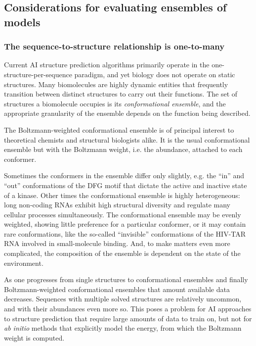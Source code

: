 \documentclass[%
 aip,
 amsmath,amssymb,
 reprint,%
]{revtex4-1}
\begin{document}
\subsection{Considerations for evaluating ensembles of models}

\subsubsection{The sequence-to-structure relationship is one-to-many}

Current AI structure prediction algorithms primarily operate in the one-structure-per-sequence paradigm, and yet biology does not operate on static structures. Many biomolecules are highly dynamic entities that frequently transition between distinct structures to carry out their functions. The set of structures a biomolecule occupies is its {\it conformational ensemble}, and the appropriate granularity of the ensemble depends on the function being described. 

The Boltzmann-weighted conformational ensemble is of principal interest to theoretical chemists and structural biologists alike. It is the usual conformational ensemble but with the Boltzmann weight, i.e. the abundance, attached to each conformer.

Sometimes the conformers in the ensemble differ only slightly, e.g. the ``in'' and ``out'' conformations of the DFG motif that dictate the active and inactive state of a kinase. Other times the conformational ensemble is highly heterogeneous: long non-coding RNAs exhibit high structural diversity and regulate many cellular processes simultaneously. The conformational ensemble may be evenly weighted, showing little preference for a particular conformer, or it may contain rare conformations, like the so-called ``invisible'' conformations of the HIV-TAR RNA involved in small-molecule binding. And, to make matters even more complicated, the composition of the ensemble is dependent on the state of the environment.

As one progresses from single structures to conformational ensembles and finally Boltzmann-weighted conformational ensembles that amount available data decreases. Sequences with multiple solved structures are relatively uncommon, and with their abundances even more so. This poses a problem for AI approaches to structure prediction that require large amounts of data to train on, but not for {\it ab initio} methods that explicitly model the energy, from which the Boltzmann weight is computed.
\end{document}
